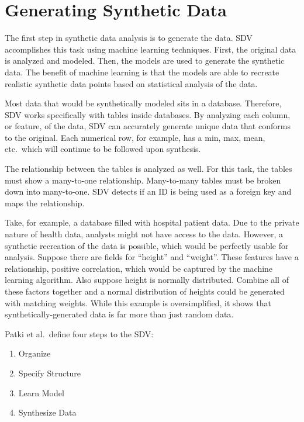 \section{Generating Synthetic Data}

The first step in synthetic data analysis is to generate the data. SDV
accomplishes this task using machine learning techniques. First, the original
data is analyzed and modeled. Then, the models are used to generate the
synthetic data. The benefit of machine learning is that the models are able
to recreate realistic synthetic data points based on statistical analysis
of the data.\cite{hid-sp18-526-patki-wedge-veer-sdv}

Most data that would be synthetically modeled sits in a database. Therefore,
SDV works specifically with tables inside databases. By analyzing each column,
or feature, of the data, SDV can accurately generate unique data that conforms
to the original. Each numerical row, for example, has a min, max, mean, etc.\
which will continue to be followed upon synthesis.\cite{hid-sp18-526-patki-wedge-veer-sdv}

The relationship between the tables is analyzed as well. For this task,
the tables must show a many-to-one relationship. Many-to-many tables must
be broken down into many-to-one. SDV detects if an ID is being used as a
foreign key and maps the relationship.\cite{hid-sp18-526-patki-sdv}

Take, for example, a database filled with hospital patient data. Due to
the private nature of health data, analysts might not have access to the
data. However, a synthetic recreation of the data is possible, which would be
perfectly usable for analysis. Suppose there are fields for ``height'' and
``weight''. These features have a relationship, positive correlation, which
would be captured by the machine learning algorithm. Also suppose height is
normally distributed. Combine all of these factors together and a normal
distribution of heights could be generated with matching weights. While
this example is oversimplified, it shows that synthetically-generated data
is far more than just random data.\cite{hid-sp18-526-patki-wedge-veer-sdv}

Patki et al.\ define four steps to the SDV\cite{hid-sp18-526-patki-wedge-veer-sdv}:
\begin{enumerate}
    \item Organize
    \item Specify Structure
    \item Learn Model
    \item Synthesize Data
\end{enumerate}

